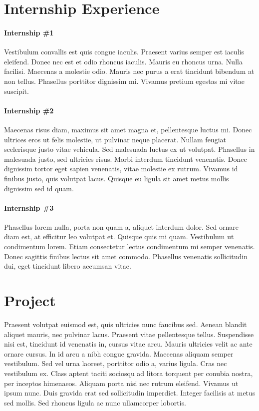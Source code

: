 \documentclass[12pt, letterpaper]{article}
\begin{document}
\section*{Internship Experience}
\paragraph{Internship \#1} Vestibulum convallis est quis congue iaculis. Praesent varius semper est iaculis eleifend. Donec nec est et odio rhoncus iaculis. Mauris eu rhoncus urna. Nulla facilisi. Maecenas a molestie odio. Mauris nec purus a erat tincidunt bibendum at non tellus. Phasellus porttitor dignissim mi. Vivamus pretium egestas mi vitae suscipit.

\paragraph{Internship \#2} Maecenas risus diam, maximus sit amet magna et, pellentesque luctus mi. Donec ultrices eros ut felis molestie, ut pulvinar neque placerat. Nullam feugiat scelerisque justo vitae vehicula. Sed malesuada luctus ex ut volutpat. Phasellus in malesuada justo, sed ultricies risus. Morbi interdum tincidunt venenatis. Donec dignissim tortor eget sapien venenatis, vitae molestie ex rutrum. Vivamus id finibus justo, quis volutpat lacus. Quisque eu ligula sit amet metus mollis dignissim sed id quam.

\paragraph{Internship \#3} Phasellus lorem nulla, porta non quam a, aliquet interdum dolor. Sed ornare diam est, at efficitur leo volutpat et. Quisque quis mi quam. Vestibulum ut condimentum lorem. Etiam consectetur lectus condimentum mi semper venenatis. Donec sagittis finibus lectus sit amet commodo. Phasellus venenatis sollicitudin dui, eget tincidunt libero accumsan vitae.
\section*{Project}
Praesent volutpat euismod est, quis ultricies nunc faucibus sed. Aenean blandit aliquet mauris, nec pulvinar lacus. Praesent vitae pellentesque tellus. Suspendisse nisi est, tincidunt id venenatis in, cursus vitae arcu. Mauris ultricies velit ac ante ornare cursus. In id arcu a nibh congue gravida. Maecenas aliquam semper vestibulum. Sed vel urna laoreet, porttitor odio a, varius ligula. Cras nec vestibulum ex. Class aptent taciti sociosqu ad litora torquent per conubia nostra, per inceptos himenaeos. Aliquam porta nisi nec rutrum eleifend. Vivamus ut ipsum nunc. Duis gravida erat sed sollicitudin imperdiet. Integer facilisis at metus sed mollis. Sed rhoncus ligula ac nunc ullamcorper lobortis.
\end{document}
